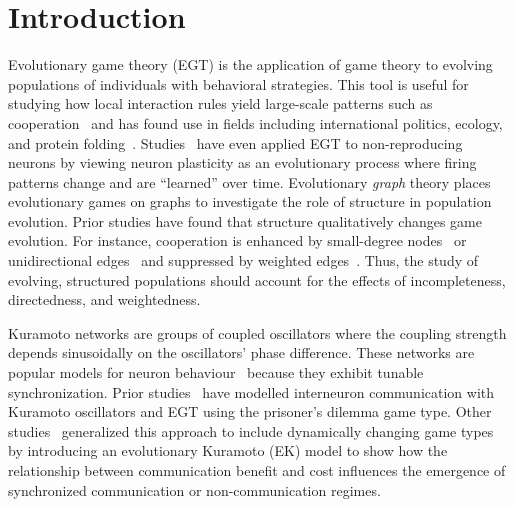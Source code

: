 \documentclass[pdflatex,twocolumn,sn-nature,super]{sn-jnl}
\begin{document}
\section{Introduction}
Evolutionary game theory (EGT) is the application
of game theory to evolving populations
of individuals with behavioral strategies.
This tool is useful for studying how local interaction rules
yield large-scale patterns such as cooperation~\citep{sigmund1999evolutionary}
and has found use in fields including international politics, ecology,
and protein folding~\citep{traulsen2023future}.
Studies~\citep{cohen2009evolutionary,antonioni2017coevolution,tripp2022evolutionary}
have even applied EGT to non-reproducing neurons
by viewing neuron plasticity as an evolutionary process
where firing patterns change and are ``learned'' over time.
Evolutionary \emph{graph} theory places evolutionary games
on graphs to investigate the role of structure in population evolution.
Prior studies have found that structure
qualitatively changes game evolution.
For instance, cooperation is enhanced by
small-degree nodes~\citep{ohtsuki2006simple}
or unidirectional edges~\citep{su2022evolution}
and suppressed by weighted edges~\citep{bhaumik2024constant}.
Thus, the study of evolving, structured populations
should account for the effects of
incompleteness, directedness, and weightedness.

Kuramoto networks are groups of coupled oscillators
where the coupling strength depends sinusoidally
on the oscillators' phase difference.
These networks are popular
models for neuron behaviour~\citep{cabral2011role,deng2024chimera}
because they exhibit tunable synchronization.
Prior studies~\citep{antonioni2017coevolution}
have modelled interneuron communication
with Kuramoto oscillators and EGT
using the prisoner's dilemma game type.
Other studies~\citep{tripp2022evolutionary}
generalized this approach to include dynamically changing game types
by introducing an evolutionary Kuramoto (EK) model
to show how the relationship between communication benefit and cost
influences the emergence of synchronized communication
or non-communication regimes.
\end{document}
